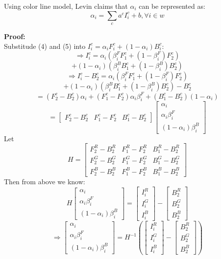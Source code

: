 \documentclass[11pt,letterpaper]{article}
\begin{document}
Using color line model, Levin claims that $\alpha_i$ can be represented as:
$$\alpha_i = \sum_{c}a^cI_i^c + b, \forall i \in w$$

\textbf{Proof:} \\
Substitude (4) and (5) into $I_i^c = \alpha_i F_i^c + (1-\alpha_i)B_i^c$:
$$\Rightarrow I_i^c = \alpha_i (\beta^F_{i} F_1^c + (1-\beta^F_{i})F_2^c)$$
$$ + (1-\alpha_i)(\beta^B_{i} B_1^c + (1-\beta^B_{i})B_2^c)$$
$$\Rightarrow I_i^c - B_2^c = \alpha_i (\beta^F_{i} F_1^c + (1-\beta^F_{i})F_2^c)$$
$$ + (1-\alpha_i)(\beta^B_{i} B_1^c + (1-\beta^B_{i})B_2^c) - B_2^c$$
$$ = (F_2^c - B_2^c)\alpha_i + (F_1^c - F_2^c)\alpha_i \beta_i^F + (B_1^c - B_2^c)(1-\alpha_i)$$
$$ = \begin{bmatrix}
    F_2^c - B_2^c & F_1^c - F_2^c & B_1^c - B_2^c
  \end{bmatrix}
  \begin{bmatrix}
    \alpha_i \\ \alpha_i \beta_i^F \\ (1-\alpha_i)\beta_i^B
  \end{bmatrix} $$
Let $$H = \begin{bmatrix}
    F_2^R - B_2^R & F_1^R - F_2^R & B_1^R - B_2^R \\
    F_2^G - B_2^G & F_1^G - F_2^G & B_1^G - B_2^G \\
    F_2^B - B_2^B & F_1^B - F_2^B & B_1^B - B_2^B 
  \end{bmatrix}$$
Then from above we know:
$$H\begin{bmatrix}
    \alpha_i \\ \alpha_i \beta_i^F \\ (1-\alpha_i)\beta_i^B
  \end{bmatrix} = 
  \begin{bmatrix}
    I_i^R \\ I_i^G \\ I_i^B
  \end{bmatrix} - 
  \begin{bmatrix}
    B_2^R \\ B_2^G \\ B_2^B
  \end{bmatrix}$$
$$\Rightarrow \begin{bmatrix}
    \alpha_i \\ \alpha_i \beta_i^F \\ (1-\alpha_i)\beta_i^B
  \end{bmatrix} = H^{-1}(
  \begin{bmatrix}
    I_i^R \\ I_i^G \\ I_i^B
  \end{bmatrix} - 
  \begin{bmatrix}
    B_2^R \\ B_2^G \\ B_2^B
  \end{bmatrix})$$
\end{document}
